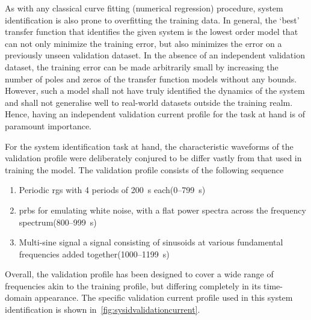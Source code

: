 As with  any classical  curve fitting  (numerical regression)  procedure, system
identification is also  prone to overfitting the training data.  In general, the
`best' transfer  function that identifies the  given system is the  lowest order
model that  can not  only minimize  the training error,  but also  minimizes the
error  on  a  previously  unseen  validation  dataset.  In  the  absence  of  an
independent validation dataset, the training error can be made arbitrarily small
by increasing  the number  of poles  and zeros of  the transfer  function models
without any  bounds. However, such a  model shall not have  truly identified the
dynamics of  the system  and shall  not generalise  well to  real-world datasets
outside  the training  realm. Hence,  having an  independent validation  current
profile for the task at hand is of paramount importance.

For the system identification task at  hand, the characteristic waveforms of the
validation profile were deliberately conjured to be differ vastly from that used
in training the model. The  validation profile consists of the following
sequence
\begin{enumerate}
    \item Periodic \gls{rgs} with 4 periods of \SI{200}{\second} each\quad (0--\SI{799}{\second})
    \item \gls{prbs} for emulating white noise, \ie{} with a flat power spectra
        across the frequency spectrum\quad (800--\SI{999}{\second})
    \item Multi-sine signal \ie{} a signal consisting of sinusoids at
        various fundamental frequencies added together\quad (1000--\SI{1199}{\second})
\end{enumerate}

Overall,  the validation  profile has  been designed  to cover  a wide  range of
frequencies  akin to  the  training  profile, but  differing  completely in  its
time-domain appearance.  The specific  validation current  profile used  in this
system identification is shown in~\cref{fig:sysidvalidationcurrent}.

